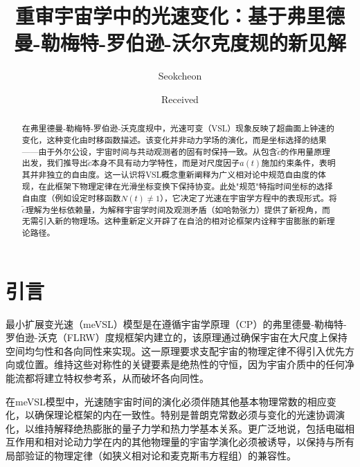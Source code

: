 \documentclass[jkps,preprint,fleqn]{revtex4}
\newcommand{\tc}{\tilde{c}}
\begin{document}
\setcounter{page}{0}

\title[]{重审宇宙学中的光速变化：基于弗里德曼-勒梅特-罗伯逊-沃尔克度规的新见解}
\author{Seokcheon }

\date[]{Received }

\begin{abstract}
在弗里德曼-勒梅特-罗伯逊-沃克度规中，光速可变（VSL）现象反映了超曲面上钟速的变化，这种变化由时移函数描述。该变化并非动力学场的演化，而是坐标选择的结果——由于外尔公设，宇宙时间与共动观测者的固有时保持一致。从包含$\tc$的作用量原理出发，我们推导出$\tc$本身不具有动力学特性，而是对尺度因子$a(t)$施加约束条件，表明其并非独立的自由度。这一认识将VSL概念重新阐释为广义相对论中规范自由度的体现，在此框架下物理定律在光滑坐标变换下保持协变。此处"规范"特指时间坐标的选择自由度（例如设定时移函数$N(t) \neq 1$），它决定了光速在宇宙学方程中的表现形式。将$\tc$理解为坐标依赖量，为解释宇宙学时间及观测矛盾（如哈勃张力）提供了新视角，而无需引入新的物理场。这种重新定义开辟了在自洽的相对论框架内诠释宇宙膨胀的新理论路径。
\end{abstract}

\maketitle

\tableofcontents
\section{引言}
\label{sec:intro}

最小扩展变光速（meVSL）模型是在遵循宇宙学原理（CP）的弗里德曼-勒梅特-罗伯逊-沃克（FLRW）度规框架内建立的，该原理通过确保宇宙在大尺度上保持空间均匀性和各向同性来实现\cite{Lee:2020zts,Lee:2023bjz,Lee:2024mal}。这一原理要求支配宇宙的物理定律不得引入优先方向或位置。维持这些对称性的关键要素是绝热性的守恒，因为宇宙介质中的任何净能流都将建立特权参考系，从而破坏各向同性\cite{Lee:2022heb}。

在meVSL模型中，光速随宇宙时间的演化必须伴随其他基本物理常数的相应变化，以确保理论框架的内在一致性。特别是普朗克常数必须与变化的光速协调演化，以维持解释绝热膨胀的量子力学和热力学基本关系\cite{Lee:2022heb}。更广泛地说，包括电磁相互作用和相对论动力学在内的其他物理量的宇宙学演化必须被诱导，以保持与所有局部验证的物理定律（如狭义相对论和麦克斯韦方程组）的兼容性\cite{Lee:2020zts,Lee:2023bjz,Lee:2024mal,Lee:2022heb}。
\end{document}
